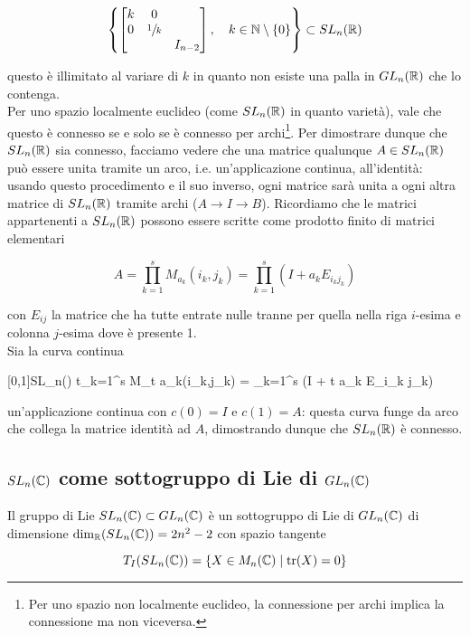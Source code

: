 \begin{equation}
	\left\{ %
			\bmqty{\dmat{ k & 0 \\ 0 & \sfrac{1}{k}, I_{n-2} }} \qcomma k \in \N \setminus \{0\}
	\right\} %
	\subset SL_{n}(\R)
\end{equation}

questo è illimitato al variare di $ k $ in quanto non esiste una palla in $ GL_{n}(\mathbb{R}) $ che lo contenga.\\
Per uno spazio localmente euclideo (come $ SL_{n}(\mathbb{R}) $ in quanto varietà), vale che questo è connesso se e solo se è connesso per archi\footnote{%
	Per uno spazio non localmente euclideo, la connessione per archi implica la connessione ma non viceversa.%
}. Per dimostrare dunque che $ SL_{n}(\mathbb{R}) $ sia connesso, facciamo vedere che una matrice qualunque $ A \in SL_{n}(\mathbb{R}) $ può essere unita tramite un arco, i.e. un'applicazione continua, all'identità: usando questo procedimento e il suo inverso, ogni matrice sarà unita a ogni altra matrice di $ SL_{n}(\mathbb{R}) $ tramite archi ($ A \to I \to B $). Ricordiamo che le matrici appartenenti a $ SL_{n}(\mathbb{R}) $ possono essere scritte come prodotto finito di matrici elementari

\begin{equation}
	A = \prod_{k=1}^{s} M_{a_{k}}(i_{k},j_{k}) %
	= \prod_{k=1}^{s} (I + a_{k} E_{i_{k} j_{k}})
\end{equation}

con $ E_{ij} $ la matrice che ha tutte entrate nulle tranne per quella nella riga $ i $-esima e colonna $ j $-esima dove è presente 1.\\
Sia la curva continua

	{[0,1]}{SL_{n}(\R)}
	{t}{\prod_{k=1}^{s} M_{t a_{k}}(i_{k},j_{k}) = \prod_{k=1}^{s} (I + t a_{k} E_{i_{k} j_{k}})}
	
un'applicazione continua con $ c(0) = I $ e $ c(1) = A $: questa curva funge da arco che collega la matrice identità ad $ A $, dimostrando dunque che $ SL_{n}(\mathbb{R}) $ è connesso.

\subsection{$ SL_{n}(\mathbb{C}) $ come sottogruppo di Lie di $ GL_{n}(\mathbb{C}) $}

Il gruppo di Lie $ SL_{n}(\mathbb{C}) \subset GL_{n}(\mathbb{C}) $ è un sottogruppo di Lie di $ GL_{n}(\mathbb{C}) $ di dimensione $ \dim_{\mathbb{R}}(SL_{n}(\mathbb{C})) = 2 n^{2} - 2 $ con spazio tangente

\begin{equation}
	T_{I}(SL_{n}(\mathbb{C})) = \{ X \in M_{n}(\mathbb{C}) \mid \tr(X) = 0 \}
\end{equation}


